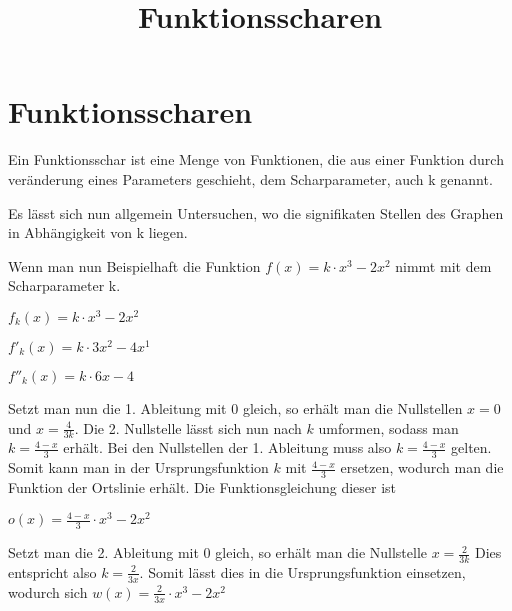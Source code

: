 \documentclass[10pt,a4paper]{article}
\begin{document}
\setlength{\parindent}{0cm}

\title{Funktionsscharen}

\makeatletter
\def\@maketitle{%
  \newpage
  \null
  \vskip 2em%
  \begin{center}%
  \let \footnote \thanks
    {\Huge\bfseries\@title \par}%
    \vskip 1.5em%
    {\large
      \lineskip .5em%
      \begin{tabular}[t]{c}%
        \@author
      \end{tabular}\par}%
    \vskip 1em%
    {\large \@date}%
  \end{center}%
  \par
  \vskip 1.5em}
\makeatother

\author{}
\date{}

\maketitle

\section*{Funktionsscharen}

Ein Funktionsschar ist eine Menge von Funktionen, die aus einer Funktion durch veränderung
eines Parameters geschieht, dem Scharparameter, auch k genannt.

Es lässt sich nun allgemein Untersuchen, wo die signifikaten Stellen des Graphen in Abhängigkeit
von k liegen.

Wenn man nun Beispielhaft die Funktion $f(x) = k \cdot x^3 - 2x^2$ nimmt mit dem Scharparameter k.

$f_{k}(x) = k \cdot x^3 - 2x^2$

$f'_{k}(x) = k \cdot 3x^2 - 4x^1$

$f''_{k}(x) = k \cdot 6x - 4$

Setzt man nun die 1. Ableitung mit 0 gleich, so erhält man die Nullstellen $x = 0$ und $x = \frac{4}{3k}$.
Die 2. Nullstelle lässt sich nun nach $k$ umformen, sodass man $k = \frac{4 - x}{3}$ erhält.
Bei den Nullstellen der 1. Ableitung muss also $k = \frac{4-x}{3}$ gelten.
Somit kann man in der Ursprungsfunktion $k$ mit $\frac{4-x}{3}$ ersetzen, wodurch man die Funktion
der Ortslinie erhält. Die Funktionsgleichung dieser ist \newline

$o(x) = \frac{4-x}{3} \cdot x^3 - 2x^2$ \newline

Setzt man die 2. Ableitung mit 0 gleich, so erhält man die Nullstelle $x = \frac{2}{3k}$
Dies entspricht also $k = \frac{2}{3x}$. Somit lässt dies in die Ursprungsfunktion einsetzen,
wodurch sich $w(x) = \frac{2}{3x} \cdot x^3 - 2x^2$
\end{document}
